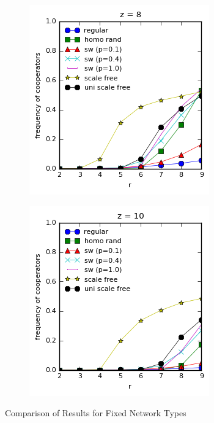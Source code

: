 \documentclass{article}
\begin{document}
\begin{figure}[h]
\begin{subfigure}[b]{0.4\textwidth}
			\caption{}
		\end{subfigure}
		\begin{subfigure}[b]{0.4\textwidth}
			\includegraphics[width=\textwidth]{fig/fixed/z8all.png}
			\caption{}
		\end{subfigure}
		\begin{subfigure}[b]{0.4\textwidth}
			\includegraphics[width=\textwidth]{fig/fixed/z10all.png}
			\caption{}
		\end{subfigure}
		\caption{Comparison of Results for Fixed Network Types}
		\label{fig:compfixed}
	\end{figure}
\end{document}
